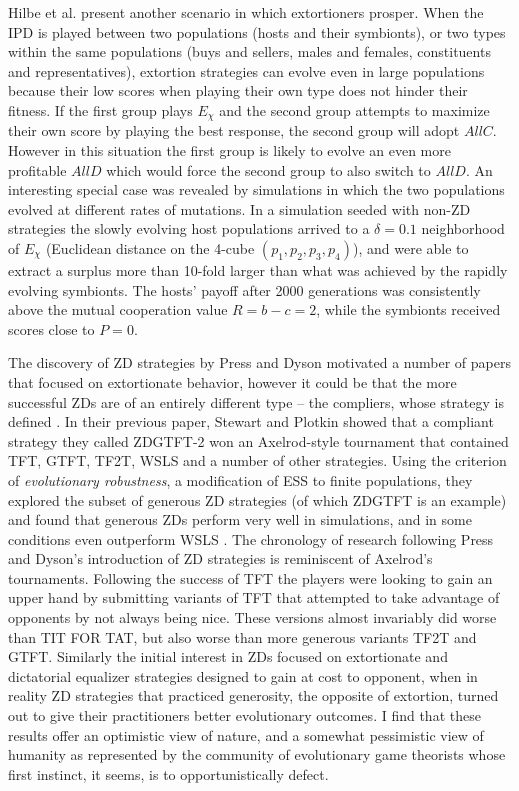 Hilbe et al. present another scenario in which extortioners prosper. When the IPD is played between two populations (hosts and their symbionts), or two types within the same populations (buys and sellers, males and females, constituents and representatives), extortion strategies can evolve even in large populations because their low scores when playing their own type does not hinder their fitness. If the first group plays $E_\chi$ and the second group attempts to maximize their own score by playing the best response, the second group will adopt $AllC$. However in this situation the first group is likely to evolve an even more profitable $AllD$ which would force the second group to also switch to $AllD$. An interesting special case was revealed by simulations in which the two populations evolved at different rates of mutations. In a simulation seeded with non-ZD strategies the slowly evolving host populations arrived to a $\delta = 0.1$ neighborhood of $E_\chi$ (Euclidean distance on the 4-cube $(p_1, p_2, p_3, p_4)$), and were able to extract a surplus more than 10-fold larger than what was achieved by the rapidly evolving symbionts. The hosts' payoff after 2000 generations was consistently above the mutual cooperation value $R = b-c = 2$, while the symbionts received scores close to $P = 0$. 

The discovery of ZD strategies by Press and Dyson motivated a number of papers that focused on extortionate behavior, however it could be that the more successful ZDs are of an entirely different type -- the compliers, whose strategy is defined . In their previous paper, Stewart and Plotkin showed that a compliant strategy they called ZDGTFT-2 won an Axelrod-style tournament that contained TFT, GTFT, TF2T, WSLS and a number of other strategies. Using the criterion of \textit{evolutionary robustness}, a modification of ESS to finite populations, they explored the subset of generous ZD strategies (of which ZDGTFT is an example) and found that generous ZDs perform very well in simulations, and in some conditions even outperform WSLS \cite{Stewart03092013}. The chronology of research following Press and Dyson's introduction of ZD strategies is reminiscent of Axelrod's tournaments. Following the success of TFT the players were looking to gain an upper hand by submitting variants of TFT that attempted to take advantage of opponents by not always being nice. These versions almost invariably did worse than TIT FOR TAT, but also worse than more generous variants TF2T and GTFT. Similarly the initial interest in ZDs focused on extortionate and dictatorial equalizer strategies designed to gain at cost to opponent, when in reality ZD strategies that practiced generosity, the opposite of extortion, turned out to give their practitioners better evolutionary outcomes. I find that these results offer an optimistic view of nature, and a somewhat pessimistic view of humanity as represented by the community of evolutionary game theorists whose first instinct, it seems, is to opportunistically defect.

